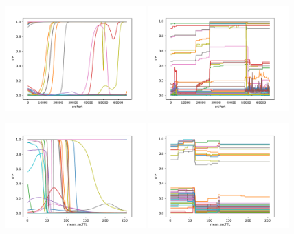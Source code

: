 \documentclass[10pt,sigconf,letterpaper]{acmart}
\begin{document}
\begin{figure}[p]
\includegraphics[width=0.48\textwidth]{../ice/sourceTransportPort_nn.pdf}
\includegraphics[width=0.48\textwidth]{../ice/sourceTransportPort_rf.pdf}

\includegraphics[width=0.48\textwidth]{../ice/apply(mean(ipTTL),forward)_nn.pdf}
\includegraphics[width=0.48\textwidth]{../ice/apply(mean(ipTTL),forward)_rf.pdf}


\end{figure}
\end{document}
